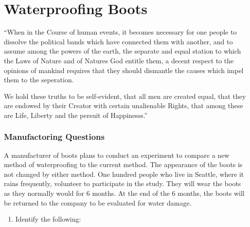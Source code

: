 \documentclass[letterpaper]{article}
\def\tightlist{}
\newcommand{\titleDOC}{}
\newcommand{\authorDOC}{Daniel Sabalakov}
\newcommand{\classDOC}{}
\begin{document}








\renewcommand{\classDOC}{DE Intro to Statistics I}

\renewcommand{\titleDOC}{Waterproofing Boots}

\renewcommand{\authorDOC}{Daniel Sabalakov}



\section{Waterproofing Boots}\label{waterproofing-boots}

``When in the Course of human events, it becomes necessary for one people to dissolve the political bands which have connected them with another, and to assume among the powers of the earth, the separate and equal station to which the Laws of Nature and of Nature\textquotesingle s God entitle them, a decent respect to the opinions of mankind requires that they should dismantle the causes which impel them to the seperation.

We hold these truths to be self-evident, that all men are created equal, that they are endowed by their Creator with certain unalienable Rights, that among these are Life, Liberty and the persuit of Happinesss.''

\subsubsection{Manufactoring Questions}\label{manufactoring-questions}

A manufacturer of boots plans to conduct an experiment to compare a new method of waterproofing to the current method. The appearance of the boots is not changed by either method. One hundred people who live in Seattle, where it rains frequently, volunteer to participate in the study. They will wear the boots as they normally would for 6 months. At the end of the 6 months, the boots will be returned to the company to be evaluated for water damage.

\begin{enumerate}
\def\labelenumi{(\alph{enumi})}
\tightlist
\item
  Identify the following:
\end{enumerate}
\end{document}
